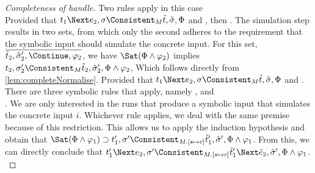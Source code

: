\begin{proof}[Completeness of handle]
    {Two rules apply in this case\\
      {
      Provided that $t_1\Next e_2,\sigma\Consistent_{M}\tilde{t},\tilde{\sigma},\Phi$ and ,
      then .
      The simulation step results in two sets, from which only the second adheres to the requirement that the symbolic input should simulate the concrete input.
      For this set, $\overline{\tilde{t}_2,\tilde{\sigma}_2',\Continue,\phi_2}$, we have $\Sat(\Phi\land\phi_2)$ implies
      $t_2,\sigma_2'\Consistent_M\tilde{t}_2,\tilde{\sigma}_2',\Phi\land\phi_2$,
      Which follows directly from \cref{lem:completeNormalise}.
      }
      {
      Provided that $t_1\Next e_2,\sigma\Consistent_{M}\tilde{t},\tilde{\sigma},\Phi$ and .
      There are three symbolic rules that apply, namely ,  and\\
      .
      We are only interested in the runs that produce a symbolic input that simulates the concrete input $i$.
      Whichever rule applies, we deal with the same premise because of this restriction.
      This allows us to apply the induction hypothesis and obtain that
      $\Sat(\Phi\land\phi_1)\implies t_1',\sigma'\Consistent_{M.[s\mapsto c]}\tilde{t}_1',\tilde{\sigma}',\Phi\land\phi_1$.
      From this, we can directly conclude that $t_1'\Next e_2,\sigma'\Consistent_{M.[s\mapsto c]}\tilde{t}_1'\Next \tilde{e}_2,\tilde{\sigma}',\Phi\land\phi_1$.
      }
    }



\end{proof}
